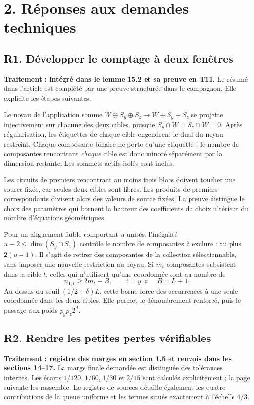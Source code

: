 \documentclass[11pt,a4paper]{article}
\begin{document}
\clearpage
\section*{2. Réponses aux demandes techniques}

\subsection*{R1. Développer le comptage à deux fenêtres}
\textbf{Traitement : intégré dans le lemme 15.2 et sa preuve en T11.}
Le résumé dans l'article est complété par une preuve structurée dans le
compagnon. Elle explicite les étapes suivantes.

Le noyau de l'application somme
\(W\oplus S_y\oplus S_z\to W+S_y+S_z\) se projette injectivement
sur chacune des deux cibles, puisque \(S_y\cap W=S_z\cap W=0\).
Après régularisation, les étiquettes de chaque cible engendrent le dual
du noyau restreint. Chaque composante binaire ne porte qu'une étiquette ;
le nombre de composantes rencontrant \emph{chaque} cible est donc minoré
séparément par la dimension restante. Les sommets actifs isolés sont inclus.

Les circuits de premiers rencontrant au moins trois blocs doivent toucher
une source fixée, car seules deux cibles sont libres. Les produits de
premiers correspondants divisent alors des valeurs de source fixées.
La preuve distingue le choix des paramètres qui bornent la hauteur des
coefficients du choix ultérieur du nombre d'équations géométriques.

Pour un alignement faible comportant \(u\) unités, l'inégalité
\(u-2\le\dim(S_y\cap S_z)\) contrôle le nombre de composantes à exclure :
au plus \(2(u-1)\). Il s'agit de retirer des composantes de la collection
sélectionnable, sans imposer une nouvelle restriction au noyau.
Si \(m_t\) composantes subsistent dans la cible \(t\), celles qui
n'utilisent qu'une coordonnée sont au nombre de
\[
 n_{1,t}\ge 2m_t-B,\qquad t=y,z,\quad B=L+1.
\]
Au-dessus du seuil \((1/2+\delta)L\), cette borne force des occurrences
à une seule coordonnée dans les deux cibles. Elle permet le dénombrement
renforcé, puis le passage aux poids \(p_yp_z2^d\).

\subsection*{R2. Rendre les petites pertes vérifiables}
\textbf{Traitement : registre des marges en section 1.5 et renvois dans
les sections 14--17.} La marge finale demandée est distinguée des
tolérances internes. Les écarts \(1/120\), \(1/60\), \(1/30\) et
\(2/15\) sont calculés explicitement ; la page suivante les rassemble.
Le registre de sources détaille également les quatre contributions de
la queue uniforme et les termes situés exactement à l'échelle \(4/3\).
\end{document}
